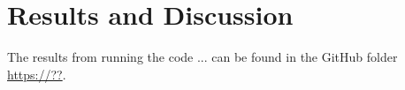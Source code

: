 \chapter{Results and Discussion}
\label{chap:Results}


The results from running the code ... can be found in the GitHub folder  \url{https://??}.
